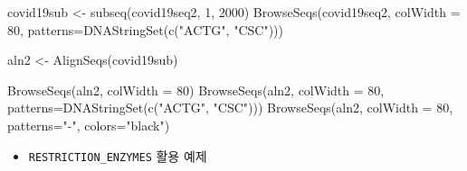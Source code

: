 \documentclass[
]{book}
\newenvironment{Shaded}{\begin{snugshade}}{\end{snugshade}}
\newcommand{\AttributeTok}[1]{\textcolor[rgb]{0.77,0.63,0.00}{#1}}
\newcommand{\DecValTok}[1]{\textcolor[rgb]{0.00,0.00,0.81}{#1}}
\newcommand{\FunctionTok}[1]{\textcolor[rgb]{0.00,0.00,0.00}{#1}}
\newcommand{\NormalTok}[1]{#1}
\newcommand{\OtherTok}[1]{\textcolor[rgb]{0.56,0.35,0.01}{#1}}
\newcommand{\StringTok}[1]{\textcolor[rgb]{0.31,0.60,0.02}{#1}}
\providecommand{\tightlist}{%
  \setlength{\itemsep}{0pt}\setlength{\parskip}{0pt}}
\begin{document}
\begin{Shaded}
\begin{Highlighting}[]

\NormalTok{covid19sub }\OtherTok{\textless{}{-}} \FunctionTok{subseq}\NormalTok{(covid19seq2, }\DecValTok{1}\NormalTok{, }\DecValTok{2000}\NormalTok{)}
\FunctionTok{BrowseSeqs}\NormalTok{(covid19seq2, }\AttributeTok{colWidth =} \DecValTok{80}\NormalTok{, }\AttributeTok{patterns=}\FunctionTok{DNAStringSet}\NormalTok{(}\FunctionTok{c}\NormalTok{(}\StringTok{"ACTG"}\NormalTok{, }\StringTok{"CSC"}\NormalTok{)))}


\NormalTok{aln2 }\OtherTok{\textless{}{-}} \FunctionTok{AlignSeqs}\NormalTok{(covid19sub)}

\FunctionTok{BrowseSeqs}\NormalTok{(aln2, }\AttributeTok{colWidth =} \DecValTok{80}\NormalTok{)}
\FunctionTok{BrowseSeqs}\NormalTok{(aln2, }\AttributeTok{colWidth =} \DecValTok{80}\NormalTok{, }\AttributeTok{patterns=}\FunctionTok{DNAStringSet}\NormalTok{(}\FunctionTok{c}\NormalTok{(}\StringTok{"ACTG"}\NormalTok{, }\StringTok{"CSC"}\NormalTok{)))}
\FunctionTok{BrowseSeqs}\NormalTok{(aln2, }\AttributeTok{colWidth =} \DecValTok{80}\NormalTok{, }\AttributeTok{patterns=}\StringTok{"{-}"}\NormalTok{, }\AttributeTok{colors=}\StringTok{"black"}\NormalTok{)}
\end{Highlighting}
\end{Shaded}

\begin{itemize}
\tightlist
\item
  \texttt{RESTRICTION\_ENZYMES} 활용 예제
\end{itemize}
\end{document}
